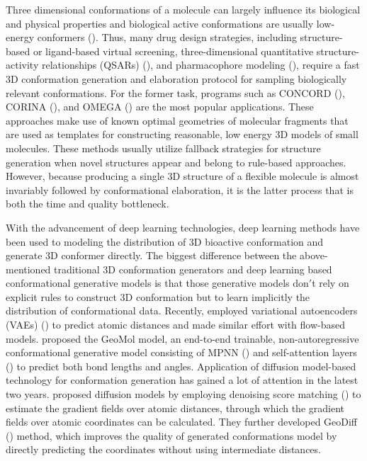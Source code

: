 \documentclass{article} %
\begin{document}
Three dimensional conformations of a molecule can largely influence its biological and physical properties and biological active conformations are usually low-energy conformers (\cite{perola2004conformational}). Thus, many drug design strategies, including structure-based or ligand-based virtual screening, three-dimensional quantitative structure-activity relationships (QSARs) (\cite{cruciani2003three}), and pharmacophore modeling (\cite{schwab2010conformations}), require a fast 3D conformation generation and elaboration protocol for sampling biologically relevant conformations. For the former task, programs such as CONCORD (\cite{hendrickson1993concord}), CORINA (\cite{gasteiger1990automatic}), and OMEGA (\cite{hawkins2010conformer}) are the most popular applications.
These approaches make use of known optimal geometries of molecular fragments that are used as templates for constructing reasonable, low energy 3D models of small molecules. 
These methods usually utilize fallback strategies for structure generation when novel structures appear and belong to rule-based approaches.
However, because producing a single 3D structure of a flexible molecule is almost invariably followed by conformational elaboration, it is the latter process that is both the time and quality bottleneck.

With the advancement of deep learning technologies, deep learning methods have been used to modeling the distribution of 3D bioactive conformation and generate 3D conformer directly. The biggest difference between the above-mentioned traditional 3D conformation generators and deep learning based conformational generative models is that those generative models don$'$t rely on explicit rules to construct 3D conformation but to learn implicitly the distribution of conformational data. Recently, \cite{simm2019generative, xu2021end} employed variational autoencoders (VAEs) (\cite{kingma2013auto}) to predict atomic distances and \cite{dinh2016density} made similar effort with flow-based models. \cite{ganea2021geomol} proposed the GeoMol model, an end-to-end trainable, non-autoregressive conformational generative model consisting of MPNN (\cite{gilmer2017neural}) and self-attention layers (\cite{vaswani2017attention}) to predict both bond lengths and angles. Application of diffusion model-based technology for conformation generation has gained a lot of attention in the latest two years. \cite{shi2021learning} proposed diffusion models by employing denoising score matching (\cite{song2019generative, song2020improved}) to estimate the gradient fields over atomic distances, through which the gradient fields over atomic coordinates can be calculated. They further developed GeoDiff (\cite{xu2022geodiff}) method, which improves the quality of generated conformations model by directly predicting the coordinates without using intermediate distances.
\end{document}
